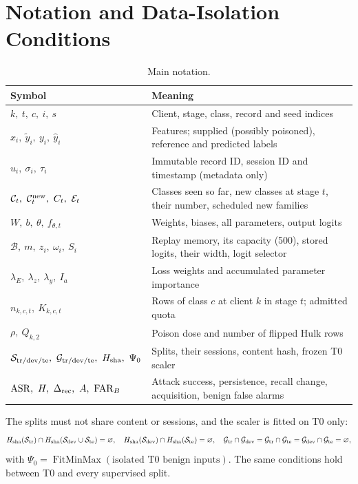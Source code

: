 \documentclass[10pt,a4paper]{article}
\begin{document}
\section{Notation and Data-Isolation Conditions}
\label{app:notation}
\begin{table}[htbp]
\centering\footnotesize
\caption{Main notation.}
\label{tab:notation}
\begin{tabularx}{\linewidth}{L{4.6cm}Y}
\toprule
Symbol & Meaning\\
\midrule
$k,\ t,\ c,\ i,\ s$ & Client, stage, class, record and seed indices\\
$x_i,\ \widetilde y_i,\ y_i,\ \widehat y_i$ & Features; supplied (possibly poisoned), reference and predicted labels\\
$u_i,\ \sigma_i,\ \tau_i$ & Immutable record ID, session ID and timestamp (metadata only)\\
$\mathcal C_t,\ \mathcal C_t^{\rm new},\ C_t,\ \mathcal E_t$ & Classes seen so far, new classes at stage $t$, their number, scheduled new families\\
$W,\ b,\ \theta,\ f_{\theta,t}$ & Weights, biases, all parameters, output logits\\
$\mathcal B,\ m,\ z_i,\ \omega_i,\ S_i$ & Replay memory, its capacity (500), stored logits, their width, logit selector\\
$\lambda_E,\ \lambda_z,\ \lambda_y,\ I_a$ & Loss weights and accumulated parameter importance\\
$n_{k,c,t},\ K_{k,c,t}$ & Rows of class $c$ at client $k$ in stage $t$; admitted quota\\
$\rho,\ Q_{k,2}$ & Poison dose and number of flipped Hulk rows\\
$\mathcal S_{\rm tr/dev/te},\ \mathcal G_{\rm tr/dev/te},\ H_{\rm sha},\ \Psi_0$ & Splits, their sessions, content hash, frozen T0 scaler\\
$\mathrm{ASR},\ H,\ \Delta_{\rm rec},\ A,\ \mathrm{FAR}_B$ & Attack success, persistence, recall change, acquisition, benign false alarms\\
\bottomrule
\end{tabularx}
\end{table}
The splits must not share content or sessions, and the scaler is fitted on T0 only:
\begin{equation}
H_{\rm sha}(\mathcal S_{\rm tr})\cap H_{\rm sha}(\mathcal S_{\rm dev}\cup\mathcal S_{\rm te})=\varnothing,\quad
H_{\rm sha}(\mathcal S_{\rm dev})\cap H_{\rm sha}(\mathcal S_{\rm te})=\varnothing,\quad
\mathcal G_{\rm tr}\cap\mathcal G_{\rm dev}=\mathcal G_{\rm tr}\cap\mathcal G_{\rm te}=\mathcal G_{\rm dev}\cap\mathcal G_{\rm te}=\varnothing,
\label{eq:isolation}
\end{equation}
with $\Psi_0=\operatorname{FitMinMax}(\text{isolated T0 benign inputs})$. The same conditions hold between T0 and every supervised split.
\end{document}
